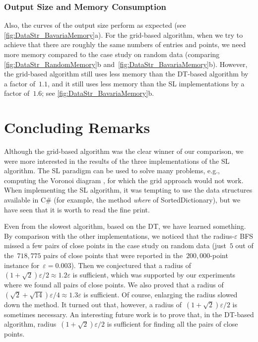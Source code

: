 \subsubsection{Output Size and Memory Consumption}
Also, the curves of the output size perform as expected
(see \fig\ref{fig:DataStr_BavariaMemory}a). 
For the grid-based algorithm, when we try to achieve that 
there are roughly the same numbers of entries and points, 
we need more memory compared to the case study on random data
(comparing \figs\ref{fig:DataStr_RandomMemory}b
and~\ref{fig:DataStr_BavariaMemory}b). 
However, the grid-based algorithm still uses less memory 
than the DT-based algorithm by a factor of~$1.1$, 
and it still uses less memory than the SL 
implementations by a factor of~$1.6$;
see \fig\ref{fig:DataStr_BavariaMemory}b.





\section{Concluding Remarks}\label{sec:DataStr_Conclusion}
Although the grid-based algorithm was the clear winner of our 
comparison, we were more interested in the results of the three 
implementations of the SL algorithm. 
The SL paradigm can be used to solve many problems,
e.g., computing the Voronoi diagram 
\parencite{Fortune1987Voronoi}, 
for which the grid approach would not work. 
When implementing the SL algorithm, 
it was tempting to use the data structures 
available in C\# (for example, the 
method \emph{where} of SortedDictionary), 
but we have seen that it is worth to read the fine print.



Even from the slowest algorithm, based on the DT, 
we have learned something. 
By comparison with the other implementations, 
we noticed that 
the radius-$\varepsilon$ BFS missed a few pairs of close points
in the case study on random data 
(just~$5$ out of the~$718{,}775$ pairs of close points
that were reported in the~$200{,}000$-point instance 
for~$\varepsilon =0.003$). 
Then we conjectured that 
a radius of~$(1+\sqrt{2})\varepsilon /2 
\approx 1.2\varepsilon$ is sufficient, 
which was supported by our experiments 
where we found all pairs of close points. 
We also proved that 
a radius of~$(\sqrt{2}+\sqrt{14})\varepsilon /4
\approx 1.3\varepsilon$ is sufficient. 
Of course, enlarging the radius slowed down the method. 
It turned out that, however, 
a radius of~$(1+\sqrt{2})\varepsilon /2$ 
is sometimes necessary.
An interesting future work is to prove that,
in the DT-based algorithm,
radius~$(1+\sqrt{2})\varepsilon /2$ is sufficient 
for finding all the pairs of close points.





